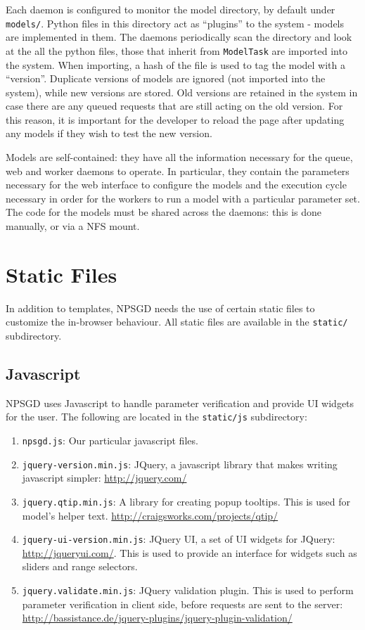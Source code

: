 \documentclass{article}
\newcommand{\mpath}[1]{\texttt{#1}}
\newcommand{\mclass}[1]{\texttt{#1}}
\begin{document}
Each daemon is configured to monitor the model directory, by default under
\mpath{models/}. Python files in this directory act as ``plugins'' to the system
- models are implemented in them. The daemons periodically scan the directory
and look at the all the python files, those that inherit from \mclass{ModelTask}
are imported into the system. When importing, a hash of the file is used to tag
the model with a ``version''. Duplicate versions of models are ignored (not
imported into the system), while new versions are stored. Old versions are
retained in the system in case there are any queued requests that are still
acting on the old version. For this reason, it is important for the developer to 
reload the page after updating any models if they wish to test the new version.

Models are self-contained: they have all the information necessary for the
queue, web and worker daemons to operate. In particular, they contain the
parameters necessary for the web interface to configure the models and the
execution cycle necessary in order for the workers to run a model with a
particular parameter set. The code for the models must be shared
across the daemons: this is done manually, or via a NFS mount.


\section{Static Files}
In addition to templates, NPSGD needs the use of certain static files to
customize the in-browser behaviour. All static files are available in the
\mpath{static/} subdirectory.

\subsection{Javascript}
NPSGD uses Javascript to handle parameter verification and provide UI
widgets for the user. The following are located in the \mpath{static/js}
subdirectory:
\begin{enumerate}
    \item \texttt{npsgd.js}: Our particular javascript files.
    \item \texttt{jquery-version.min.js}: JQuery, a javascript library that
    makes writing javascript simpler: \url{http://jquery.com/}
    \item \texttt{jquery.qtip.min.js}: A library for creating popup tooltips.
    This is used for model's helper text.
    \url{http://craigsworks.com/projects/qtip/}
    \item \texttt{jquery-ui-version.min.js}: JQuery UI, a set of UI widgets for
    JQuery: \url{http://jqueryui.com/}. This is used to provide an interface for 
    widgets such as sliders and range selectors.
    \item \texttt{jquery.validate.min.js}: JQuery validation plugin. This is
    used to perform parameter verification in client side, before requests are sent
    to the server:
    \url{http://bassistance.de/jquery-plugins/jquery-plugin-validation/}
\end{enumerate}
\end{document}
